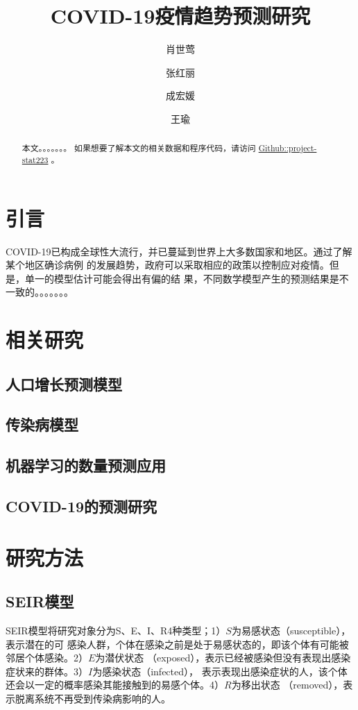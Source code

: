 \documentclass[lang=cn,11pt,a4paper,cite=authoryear]{elegantpaper}
\title{COVID-19疫情趋势预测研究}
\author{肖世莺 \and 张红丽 \and 成宏媛 \and 王瑜}
\date{}
\begin{document}
\maketitle

\begin{abstract}
本文。。。。。。。
如果想要了解本文的相关数据和程序代码，请访问
\href{https://github.com/data-science-in-action/project-stat223}{Github::project-stat223}
。
\end{abstract}

\section{引言}
COVID-19已构成全球性大流行，并已蔓延到世界上大多数国家和地区。通过了解某个地区确诊病例
的发展趋势，政府可以采取相应的政策以控制应对疫情。但是，单一的模型估计可能会得出有偏的结
果，不同数学模型产生的预测结果是不一致的。。。。。。。

\section{相关研究}

\subsection{人口增长预测模型}

\subsection{传染病模型}

\subsection{机器学习的数量预测应用}

\subsection{COVID-19的预测研究}

\section{研究方法}

\subsection{SEIR模型}
SEIR模型将研究对象分为S、E、I、R4种类型；1）$S$为易感状态（susceptible），表示潜在的可
感染人群，个体在感染之前是处于易感状态的，即该个体有可能被邻居个体感染。2）$E$为潜伏状态
（exposed），表示已经被感染但没有表现出感染症状来的群体。3）$I$为感染状态（infected），
表示表现出感染症状的人，该个体还会以一定的概率感染其能接触到的易感个体。4）$R$为移出状态
（removed），表示脱离系统不再受到传染病影响的人。
\end{document}
